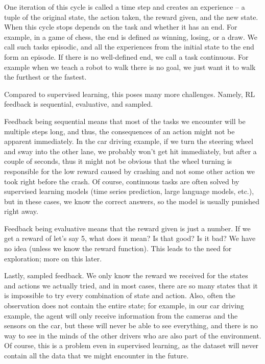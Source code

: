 \documentclass[
  digital,     %
  oneside,     %
  nosansbold,  %
  nocolorbold, %
  lof,         %
  lot,         %
]{fithesis4}
\begin{document}
One iteration of this cycle is called a time step and creates an experience -- a tuple of the original state, the action taken, the reward given, and the new state. When this cycle stops depends on the task and whether it has an end. For example, in a game of chess, the end is defined as winning, losing, or a draw. We call such tasks episodic, and all the experiences from the initial state to the end form an episode. If there is no well-defined end, we call a task continuous. For example when we teach a robot to walk there is no goal, we just want it to walk the furthest or the fastest.

Compared to supervised learning, this poses many more challenges. Namely, RL feedback is sequential, evaluative, and sampled.

Feedback being sequential means that most of the tasks we encounter will be multiple steps long, and thus, the consequences of an action might not be apparent immediately. In the car driving example, if we turn the steering wheel and sway into the other lane, we probably won’t get hit immediately, but after a couple of seconds, thus it might not be obvious that the wheel turning is responsible for the low reward caused by crashing and not some other action we took right before the crash. Of course, continuous tasks are often solved by supervised learning models (time series prediction, large language models, etc.), but in these cases, we know the correct answers, so the model is usually punished right away.

Feedback being evaluative means that the reward given is just a number. If we get a reward of let’s say 5, what does it mean? Is that good? Is it bad? We have no idea (unless we know the reward function). This leads to the need for exploration; more on this later.

Lastly, sampled feedback. We only know the reward we received for the states and actions we actually tried, and in most cases, there are so many states that it is impossible to try every combination of state and action. Also, often the observation does not contain the entire state; for example, in our car driving example, the agent will only receive information from the cameras and the sensors on the car, but these will never be able to see everything, and there is no way to see in the minds of the other drivers who are also part of the environment. Of course, this is a problem even in supervised learning, as the dataset will never contain all the data that we might encounter in the future. \cite{GDRL}
\end{document}
